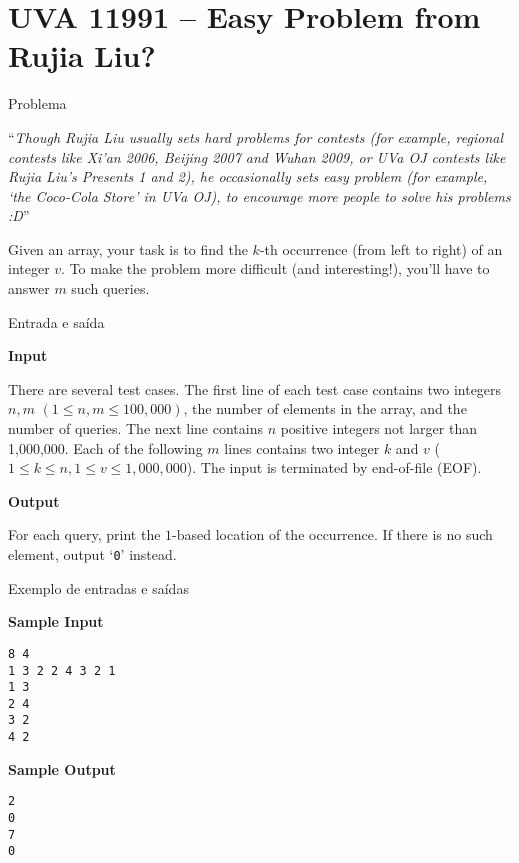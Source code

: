 \section{UVA 11991 -- Easy Problem from Rujia Liu?}

\begin{frame}[fragile]{Problema}

``\textit{Though Rujia Liu usually sets hard problems for contests (for example, regional contests 
like Xi’an 2006, Beijing 2007 and Wuhan 2009, or UVa OJ contests like Rujia Liu’s Presents 1
and 2), he occasionally sets easy problem (for example, ‘the Coco-Cola Store’ in UVa OJ),
to encourage more people to solve his problems :D}''

Given an array, your task is to find the $k$-th occurrence (from left to right) of an integer 
$v$. To make the problem more difficult (and interesting!), you’ll have to answer $m$ such queries.

\end{frame}

\begin{frame}[fragile]{Entrada e saída}

\textbf{Input}

There are several test cases. The first line of each test case contains two integers 
$n, m$ $(1\leq n, m\leq 100,000)$, the number of elements in the array, and the number of 
queries. The next line contains $n$ positive integers not larger than 1,000,000. Each of the 
following $m$ lines contains two integer $k$ and $v$ ($1\leq k\leq n, 1\leq v\leq 1,000,000$). 
The input is terminated by end-of-file (EOF).

\textbf{Output}

For each query, print the $1$-based location of the occurrence. If there is no such element, 
output ‘\texttt{0}’ instead.

\end{frame}


\begin{frame}[fragile]{Exemplo de entradas e saídas}

\begin{minipage}[t]{0.6\textwidth}
\textbf{Sample Input}
\begin{verbatim}
8 4
1 3 2 2 4 3 2 1
1 3
2 4
3 2
4 2
\end{verbatim}
\end{minipage}
\begin{minipage}[t]{0.35\textwidth}
\textbf{Sample Output}
\begin{verbatim}
2
0
7
0
\end{verbatim}
\end{minipage}
\end{frame}

